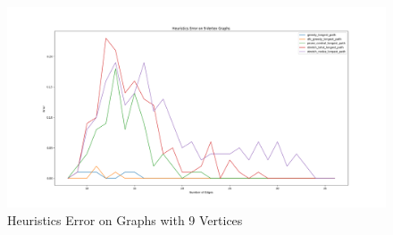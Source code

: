 \documentclass[twocolumn,showpacs,%
  nofootinbib,aps,superscriptaddress,%
  eqsecnum,prd,notitlepage,showkeys,11pt]{article}
\begin{document}
\begin{figure}[htp]
    \centering
    \includegraphics[width=\linewidth]{Error9VertexAll.png}
    \caption{Heuristics Error on Graphs with 9 Vertices}
    \label{fig:ExampleGraph}
\end{figure}
\end{document}
